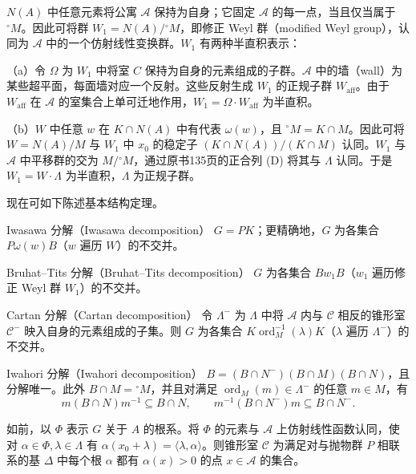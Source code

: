 $N(A)$ 中任意元素将公寓 $\mathcal A$ 保持为自身；它固定 $\mathcal A$ 的每一点，当且仅当属于 $^\circ M$。因此可将群 $W_1=N(A)/{}^\circ M$，即修正 Weyl 群（modified Weyl group），认同为 $\mathcal A$ 中的一个仿射线性变换群。$W_1$ 有两种半直积表示：

（a）令 $\Omega$ 为 $W_1$ 中将室 $C$ 保持为自身的元素组成的子群。$\mathcal A$ 中的墙（wall）为某些超平面，每面墙对应一个反射。这些反射生成 $W_1$ 的正规子群 $W_{\mathrm{aff}}$。由于 $W_{\mathrm{aff}}$ 在 $\mathcal A$ 的室集合上单可迁地作用，$W_1=\Omega\cdot W_{\mathrm{aff}}$ 为半直积。

（b）$W$ 中任意 $w$ 在 $K\cap N(A)$ 中有代表 $\omega(w)$，且 $^\circ M=K\cap M$。因此可将 $W=N(A)/M$ 与 $W_1$ 中 $x_0$ 的稳定子 $(K\cap N(A))/(K\cap M)$ 认同。$W_1$ 与 $\mathcal A$ 中平移群的交为 $M/{}^\circ M$，通过原书135页的正合列 (D) 将其与 $\Lambda$ 认同。于是 $W_1=W\cdot\Lambda$ 为半直积，$\Lambda$ 为正规子群。

现在可如下陈述基本结构定理。
\begin{originaltheorem}{Iwasawa 分解（Iwasawa decomposition）}
$G=PK$；更精确地，$G$ 为各集合 $P\omega(w)B$（$w$ 遍历 $W$）的不交并。
\end{originaltheorem}
\begin{originaltheorem}{Bruhat--Tits 分解（Bruhat--Tits decomposition）}
$G$ 为各集合 $Bw_1B$（$w_1$ 遍历修正 Weyl 群 $W_1$）的不交并。
\end{originaltheorem}
\begin{originaltheorem}{Cartan 分解（Cartan decomposition）}
令 $\Lambda^-$ 为 $\Lambda$ 中将 $\mathcal A$ 内与 $\mathcal C$ 相反的锥形室 $\mathcal C^-$ 映入自身的元素组成的子集。则 $G$ 为各集合 $K\operatorname{ord}_M^{-1}(\lambda)K$（$\lambda$ 遍历 $\Lambda^-$）的不交并。
\end{originaltheorem}
\begin{originaltheorem}{Iwahori 分解（Iwahori decomposition）}
$B=(B\cap N^-)(B\cap M)(B\cap N)$，且分解唯一。此外 $B\cap M={}^\circ M$，并且对满足 $\operatorname{ord}_M(m)\in\Lambda^-$ 的任意 $m\in M$，有
\[
m(B\cap N)m^{-1}\subseteq B\cap N,\qquad m^{-1}(B\cap N^-)m\subseteq B\cap N^-.
\]
\end{originaltheorem}
如前，以 $\Phi$ 表示 $G$ 关于 $A$ 的根系。将 $\Phi$ 的元素与 $\mathcal A$ 上仿射线性函数认同，使对 $\alpha\in\Phi,\lambda\in\Lambda$ 有 $\alpha(x_0+\lambda)=\langle\lambda,\alpha\rangle$。则锥形室 $\mathcal C$ 为满足对与抛物群 $P$ 相联系的基 $\Delta$ 中每个根 $\alpha$ 都有 $\alpha(x)>0$ 的点 $x\in\mathcal A$ 的集合。

